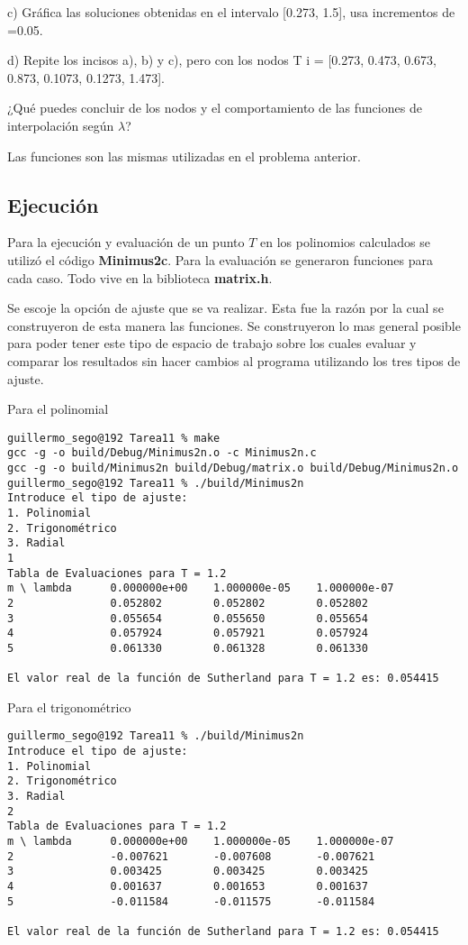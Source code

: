 \documentclass{article}
\begin{document}
c) Gráfica las soluciones obtenidas en el intervalo [0.273, 1.5], usa incrementos de =0.05. 

d) Repite los incisos a), b) y c), pero con los nodos T i = [0.273, 0.473, 0.673, 0.873, 0.1073, 0.1273, 1.473].

¿Qué puedes concluir de los nodos y el comportamiento de las funciones de interpolación según $\lambda$?


Las funciones son las mismas utilizadas en el problema anterior.

\subsection{Ejecución}
Para la ejecución y evaluación de un punto $T$ en los polinomios calculados se utilizó el código \textbf{Minimus2c}. Para la evaluación se generaron funciones para cada caso. Todo vive en la biblioteca \textbf{matrix.h}.

Se escoje la opción de ajuste que se va realizar. Esta fue la razón por la cual se construyeron de esta manera las funciones. Se construyeron lo mas general posible para poder tener este tipo de espacio de trabajo sobre los cuales evaluar y comparar los resultados sin hacer cambios al programa utilizando los tres tipos de ajuste.

Para el polinomial
\begin{lstlisting}
guillermo_sego@192 Tarea11 % make                 
gcc -g -o build/Debug/Minimus2n.o -c Minimus2n.c
gcc -g -o build/Minimus2n build/Debug/matrix.o build/Debug/Minimus2n.o
guillermo_sego@192 Tarea11 % ./build/Minimus2n    
Introduce el tipo de ajuste:
1. Polinomial
2. Trigonométrico
3. Radial
1
Tabla de Evaluaciones para T = 1.2
m \ lambda      0.000000e+00    1.000000e-05    1.000000e-07
2               0.052802        0.052802        0.052802
3               0.055654        0.055650        0.055654
4               0.057924        0.057921        0.057924
5               0.061330        0.061328        0.061330

El valor real de la función de Sutherland para T = 1.2 es: 0.054415
\end{lstlisting}

Para el trigonométrico
\begin{lstlisting}
guillermo_sego@192 Tarea11 % ./build/Minimus2n
Introduce el tipo de ajuste:
1. Polinomial
2. Trigonométrico
3. Radial
2
Tabla de Evaluaciones para T = 1.2
m \ lambda      0.000000e+00    1.000000e-05    1.000000e-07
2               -0.007621       -0.007608       -0.007621
3               0.003425        0.003425        0.003425
4               0.001637        0.001653        0.001637
5               -0.011584       -0.011575       -0.011584

El valor real de la función de Sutherland para T = 1.2 es: 0.054415
\end{lstlisting}
\end{document}

